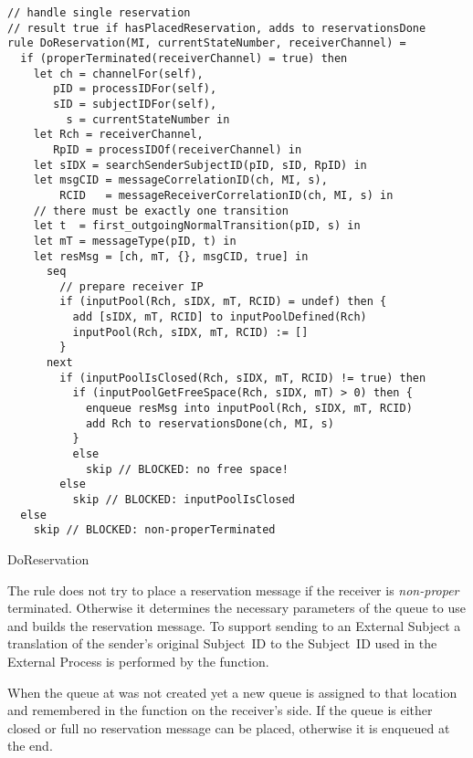 \begin{listing}[htbp]
\begin{verbatim}
// handle single reservation
// result true if hasPlacedReservation, adds to reservationsDone
rule DoReservation(MI, currentStateNumber, receiverChannel) =
  if (properTerminated(receiverChannel) = true) then
    let ch = channelFor(self),
       pID = processIDFor(self),
       sID = subjectIDFor(self),
         s = currentStateNumber in
    let Rch = receiverChannel,
       RpID = processIDOf(receiverChannel) in
    let sIDX = searchSenderSubjectID(pID, sID, RpID) in
    let msgCID = messageCorrelationID(ch, MI, s),
        RCID   = messageReceiverCorrelationID(ch, MI, s) in
    // there must be exactly one transition
    let t  = first_outgoingNormalTransition(pID, s) in
    let mT = messageType(pID, t) in
    let resMsg = [ch, mT, {}, msgCID, true] in
      seq
        // prepare receiver IP
        if (inputPool(Rch, sIDX, mT, RCID) = undef) then {
          add [sIDX, mT, RCID] to inputPoolDefined(Rch)
          inputPool(Rch, sIDX, mT, RCID) := []
        }
      next
        if (inputPoolIsClosed(Rch, sIDX, mT, RCID) != true) then
          if (inputPoolGetFreeSpace(Rch, sIDX, mT) > 0) then {
            enqueue resMsg into inputPool(Rch, sIDX, mT, RCID)
            add Rch to reservationsDone(ch, MI, s)
          }
          else
            skip // BLOCKED: no free space!
        else
          skip // BLOCKED: inputPoolIsClosed
  else
    skip // BLOCKED: non-properTerminated
\end{verbatim}
\caption{DoReservation}
\label{lst:shortasm:DoReservation}
\end{listing}


The  rule does not try to place a reservation message if the receiver is \textit{non-proper} terminated. Otherwise it determines the necessary parameters of the queue to use and builds the reservation message. To support sending to an External Subject a translation of the sender's original Subject~ID to the Subject~ID used in the External Process is performed by the  function.

When the queue at  was not created yet a new queue is assigned to that location and remembered in the  function on the receiver's side. If the queue is either closed or full no reservation message can be placed, otherwise it is enqueued at the end.


